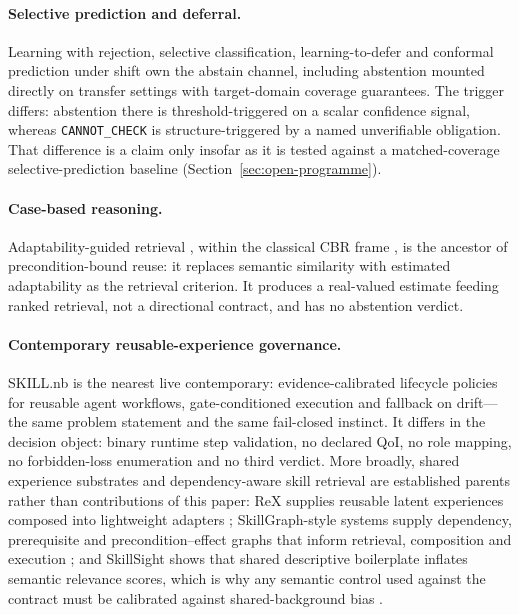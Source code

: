 \paragraph{Selective prediction and deferral.} Learning with rejection, selective classification, learning-to-defer and conformal prediction under shift \cite{cortes2016rejection,geifman2017selective,madras2018defer,wang2025conformal} own the abstain channel, including abstention mounted directly on transfer settings with target-domain coverage guarantees. The trigger differs: abstention there is threshold-triggered on a scalar confidence signal, whereas \texttt{CANNOT\_CHECK} is structure-triggered by a named unverifiable obligation. That difference is a claim only insofar as it is tested against a matched-coverage selective-prediction baseline (Section~\ref{sec:open-programme}).

\paragraph{Case-based reasoning.} Adaptability-guided retrieval \cite{leake1997adaptability}, within the classical CBR frame \cite{aamodt1994cbr}, is the ancestor of precondition-bound reuse: it replaces semantic similarity with estimated adaptability as the retrieval criterion. It produces a real-valued estimate feeding ranked retrieval, not a directional contract, and has no abstention verdict.

\paragraph{Contemporary reusable-experience governance.} SKILL.nb \cite{elhattami2026skillnb} is the nearest live contemporary: evidence-calibrated lifecycle policies for reusable agent workflows, gate-conditioned execution and fallback on drift---the same problem statement and the same fail-closed instinct. It differs in the decision object: binary runtime step validation, no declared QoI, no role mapping, no forbidden-loss enumeration and no third verdict. More broadly, shared experience substrates and dependency-aware skill retrieval are established parents rather than contributions of this paper: ReX supplies reusable latent experiences composed into lightweight adapters \cite{ling2026rex}; SkillGraph-style systems supply dependency, prerequisite and precondition--effect graphs that inform retrieval, composition and execution \cite{wu2026skillgraph,li2026skillgraphrl,xia2026grasp,sun2026agentgl}; and SkillSight shows that shared descriptive boilerplate inflates semantic relevance scores, which is why any semantic control used against the contract must be calibrated against shared-background bias \cite{xiao2026skillsight}.


